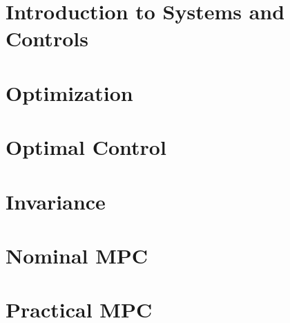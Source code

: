 \documentclass[layout=summary, columns=4,secnumdepth=2,tight]{sst-custom}
\begin{document}
\iftoggle{do-multicol}{ \begin{multicols*}{\numcolumns}}{}
		
		\iftoggle{use-small-font}{\footnotesize}{}
		\renewcommand{\contentsname}{}
		\vspace{-5mm}
		\begin{spacing}{0.9}
			\tableofcontents
		\end{spacing}
		
		\section{Introduction to Systems and Controls}
		
		\section{Optimization}
		
		\section{Optimal Control}
		
		\section{Invariance}
		
		\section{Nominal MPC}
		
		\section{Practical MPC}
		
\end{document}
